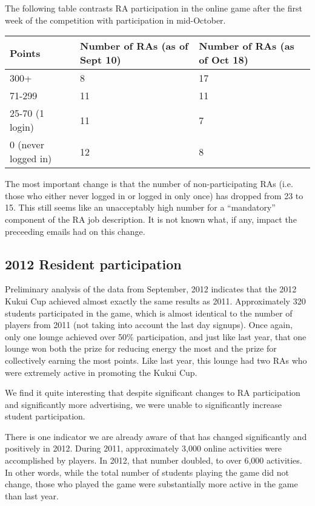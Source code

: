 \documentclass[]{article}
\begin{document}
The following table contrasts RA participation in the online game after the first week of
the competition with participation in mid-October.  

\medskip

\begin{tabular}{|p{1.5in}|p{1.5in}|p{1.5in}|}
\hline
{\bf Points} & {\bf Number of RAs \newline (as of Sept 10)} & {\bf Number of RAs \newline (as of Oct 18)} \\ \hline
300+ & 8 & 17 \\
71-299 & 11 & 11 \\
25-70 (1 login) & 11 & 7 \\
0 (never logged in) & 12 & 8 \\
\hline
\end{tabular}

The most important change is that the number of non-participating RAs (i.e. those who
either never logged in or logged in only once) has dropped from 23 to 15.  This still
seems like an unacceptably high number for a ``mandatory'' component of the RA job
description. It is not known what, if any, impact the preceeding emails had on this
change.


\subsection{2012 Resident participation}

Preliminary analysis of the data from September, 2012 indicates that the 2012 Kukui Cup
achieved almost exactly the same results as 2011.   Approximately 320 students
participated in the game, which is almost identical to the number of players from 2011
(not taking into account the last day signups).   Once again, only one lounge achieved
over 50\% participation, and just like last year, that one lounge won both the prize for
reducing energy the most and the prize for collectively earning the most points.  Like
last year, this lounge had two RAs who were extremely active in promoting the Kukui Cup.

We find it quite interesting that despite significant changes to RA participation and
significantly more advertising, we were unable to significantly increase student
participation. 

There is one indicator we are already aware of that has changed significantly and
positively in 2012.  During 2011, approximately 3,000 online activities were accomplished
by players. In 2012, that number doubled, to over 6,000 activities. In other words, 
while the total number of students playing the game did not change, those
who played the game were substantially more active in the game than last year.
\end{document}
